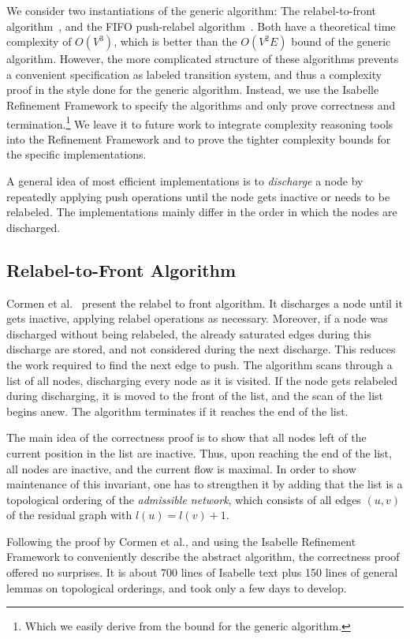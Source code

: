 \documentclass[smallcondensed]{svjour3}     %
\begin{document}
We consider two instantiations of the generic algorithm: The relabel-to-front algorithm~\cite{CLRS09}, and the FIFO push-relabel algorithm~\cite{GoTa88}.
Both have a theoretical time complexity of $O(V^3)$, which is better than the $O(V^2E)$ bound of the generic algorithm.
However, the more complicated structure of these algorithms prevents a convenient specification as labeled transition system, and thus 
a complexity proof in the style done for the generic algorithm.
Instead, we use the Isabelle Refinement Framework to specify the algorithms and only prove correctness and 
termination.\footnote{Which we easily derive from the bound for the generic algorithm.} We leave it to future work to integrate complexity reasoning tools into 
the Refinement Framework and to prove the tighter complexity bounds for the specific implementations.

A general idea of most efficient implementations is to \emph{discharge} a node by repeatedly applying push operations until the node gets inactive or needs to be relabeled.
The implementations mainly differ in the order in which the nodes are discharged.

\subsection{Relabel-to-Front Algorithm}
Cormen et al.~\cite{CLRS09} present the relabel to front algorithm.
It discharges a node until it gets inactive, applying relabel operations as necessary. 
Moreover, if a node was discharged without being relabeled, the already saturated edges during this discharge are stored, and not considered 
during the next discharge. This reduces the work required to find the next edge to push.
The algorithm scans through a list of all nodes, discharging every node as it is visited.
If the node gets relabeled during discharging, it is moved to the front of the list, and the scan of the list begins anew.
The algorithm terminates if it reaches the end of the list. 

The main idea of the correctness proof is to show that all nodes left of 
the current position in the list are inactive. Thus, upon reaching the end of the list, all nodes are inactive, and the current flow is maximal.
In order to show maintenance of this invariant, one has to strengthen it by adding that the list is a topological ordering of the 
\emph{admissible network}, which consists of all edges $(u,v)$ of the residual graph with $l(u) = l(v) + 1$. 

Following the proof by Cormen et al., and using the Isabelle Refinement Framework to conveniently describe the abstract algorithm,
the correctness proof offered no surprises. It is about 700 lines of Isabelle text plus 150 lines of general lemmas on topological orderings, 
and took only a few days to develop.
\end{document}
